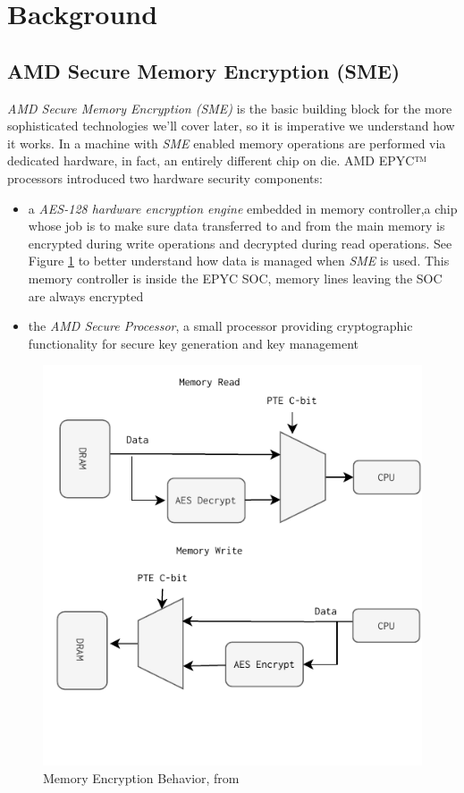\documentclass[twocolumn]{article}
\begin{document}
\section{Background}
\subsection{AMD Secure Memory Encryption (SME)}

\textit{AMD Secure Memory Encryption (SME)} is the basic building block for the more sophisticated technologies we'll cover later, so it is imperative we understand how it works. In a machine with \textit{SME} enabled memory operations are performed via dedicated hardware, in fact, an entirely different chip on die. AMD EPYC™ processors introduced two hardware security components:

\begin{itemize}
    \item a \textit{AES-128 hardware encryption engine} embedded in memory controller,a chip whose job is to make sure data transferred to and from the main memory is encrypted during write operations and decrypted during read operations. See Figure \ref{fig:memory-encryption-fig} to better understand how data is managed when \textit{SME} is used. This memory controller is inside the EPYC SOC, memory lines leaving the SOC are always encrypted
    \item the \textit{AMD Secure Processor}, a small processor providing cryptographic functionality for secure key generation and key management
\end{itemize}

\begin{figure}
    \centering
    \includegraphics[scale=0.9]{img/read-write.pdf}
    \caption{Memory Encryption Behavior, from \cite{memory-encryption}}
    \label{fig:memory-encryption-fig}
\end{figure}
\end{document}
